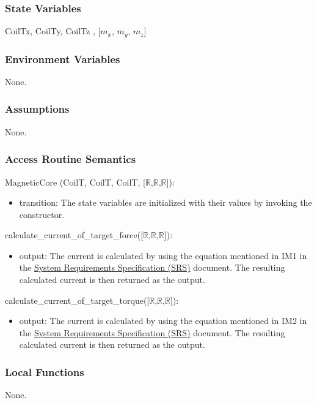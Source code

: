 \documentclass[12pt, titlepage]{article}
\begin{document}
\subsubsection{State Variables}
CoilTx,  CoilTy,  CoilTz , [$m_x$, $m_y$, $m_z$]
\subsubsection{Environment Variables}
None.
\subsubsection{Assumptions}
None.

\subsubsection{Access Routine Semantics}

\noindent MagneticCore (CoilT, CoilT, CoilT, [$\mathbb{R}$,$\mathbb{R}$,$\mathbb{R}$]):
\begin{itemize}
\item transition: The state variables are initialized with their values by invoking the constructor.
\end{itemize}

\noindent calculate\_current\_of\_target\_force([$\mathbb{R}$,$\mathbb{R}$,$\mathbb{R}$]):
\begin{itemize}
\item output: The current is calculated by using the equation mentioned in IM1 in the \href{https://github.com/rnorouziani/3D-H3C/blob/main/docs/SRS/SRS.pdf}{System Requirements Specification (SRS)} document. The resulting calculated current is then returned as the output.
\end{itemize}

\noindent calculate\_current\_of\_target\_torque([$\mathbb{R}$,$\mathbb{R}$,$\mathbb{R}$]):
\begin{itemize}
\item output: The current is calculated by using the equation mentioned in IM2 in the \href{https://github.com/rnorouziani/3D-H3C/blob/main/docs/SRS/SRS.pdf}{System Requirements Specification (SRS)} document. The resulting calculated current is then returned as the output.
\end{itemize}

\subsubsection{Local Functions}
None.
\end{document}
